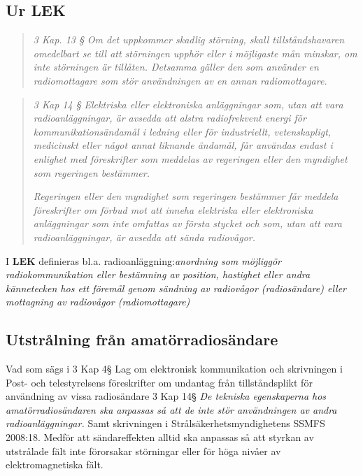 \subsection{Ur LEK}

\begin{quote}
\emph{3 Kap. 13 § Om det uppkommer skadlig störning, skall tillståndshavaren
omedelbart se till att störningen upphör eller i möjligaste mån minskar, om
inte störningen är tillåten. Detsamma gäller den som använder en
radiomottagare som stör användningen av en annan radiomottagare.}
\end{quote}

\begin{quote}
\emph{3 Kap 14 § Elektriska eller elektroniska anläggningar som, utan att vara
radioanläggningar, är avsedda att alstra radiofrekvent energi för
kommunikationsändamål i ledning eller för industriellt, vetenskapligt,
medicinskt eller något annat liknande ändamål, får användas endast i enlighet
med föreskrifter som meddelas av regeringen eller den myndighet som regeringen
bestämmer.}

\emph{Regeringen eller den myndighet som regeringen bestämmer får meddela
föreskrifter om förbud mot att inneha elektriska eller elektroniska
anläggningar som inte omfattas av första stycket och som, utan att vara
radioanläggningar, är avsedda att sända radiovågor.}
\end{quote}

I \textbf{LEK} definieras bl.a. radioanläggning:\emph{anordning som möjliggör
radiokommunikation eller bestämning av position, hastighet eller andra
kännetecken hos ett föremål genom sändning av radiovågor (radiosändare) eller
mottagning av radiovågor (radiomottagare)}

\subsection{Utstrålning från amatörradiosändare}

Vad som sägs i 3 Kap 4§ Lag om elektronisk kommunikation och skrivningen i
Post- och telestyrelsens föreskrifter om undantag från tillståndsplikt för
användning av vissa radiosändare 3 Kap 14§ \emph{De tekniska egenskaperna hos
amatörradiosändaren ska anpassas så att de inte stör användningen av andra
radioanläggningar.} Samt skrivningen i Strålsäkerhetsmyndighetens SSMFS 2008:18.
Medför att sändareffekten alltid ska anpassas så att styrkan av utstrålade
fält inte förorsakar störningar eller för höga nivåer av elektromagnetiska fält.


